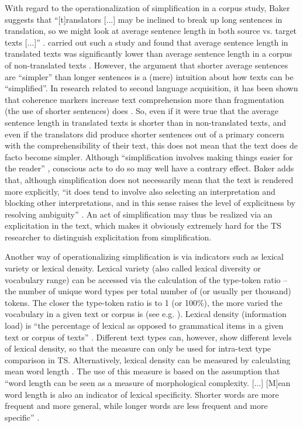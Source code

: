 With regard to the operationalization of simplification in a corpus study, Baker suggests that “[t]ranslators [...] may be inclined to break up long sentences in translation, so we might look at average sentence length in both source vs. target texts [...]” \citep[181]{baker_corpus-based_1996}. \citet{thelen_comparable_1996} carried out such a study and found that average sentence length in translated texts was significantly lower than average sentence length in a corpus of non-translated texts \citep[181]{baker_corpus-based_1996}. However, the argument that shorter average sentences are “simpler” than longer sentences is a (mere) intuition about how texts can be “simplified”. In research related to second language acquisition, it has been shown that coherence markers increase text comprehension more than fragmentation (the use of shorter sentences) does \citep{land_zwakke_2009}. So, even if it were true that the average sentence length in translated texts is shorter than in non-translated texts, and even if the translators did produce shorter sentences out of a primary concern with the comprehensibility of their text, this does not mean that the text does de facto become simpler. Although “simplification involves making things easier for the reader” \citep[182]{baker_corpus-based_1996}, conscious acts to do so may well have a contrary effect. Baker adds that, although simplification does not necessarily mean that the text is rendered more explicitly, “it does tend to involve also selecting an interpretation and blocking other interpretations, and in this sense raises the level of explicitness by resolving ambiguity” \citep[182]{baker_corpus-based_1996}. An act of simplification may thus be realized via an explicitation in the text, which makes it obviously extremely hard for the TS researcher to distinguish explicitation from simplification.

Another way of operationalizing simplification is via indicators such as lexical variety or lexical density. Lexical variety (also called lexical diversity or vocabulary range) can be accessed via the calculation of the type-token ratio – the number of unique word types per total number of (or usually per thousand) tokens. The closer the type-token ratio is to 1 (or 100\%), the more varied the vocabulary in a given text or corpus is (see e.g. \citealt{laviosa_core_1998}). Lexical density (information load) is “the percentage of lexical as opposed to grammatical items in a given text or corpus of texts” \citep[237]{baker_corpora_1995}. Different text types can, however, show different levels of lexical density, so that the measure can only be used for intra-text type comparison in TS. Alternatively, lexical density can be measured by calculating mean word length \citep{Kruger2012}. The use of this measure is based on the assumption that “word length can be seen as a measure of morphological complexity. [...] [M]ean word length is also an indicator of lexical specificity. Shorter words are more frequent and more general, while longer words are less frequent and more specific” \citep[366]{Kruger2012}.

